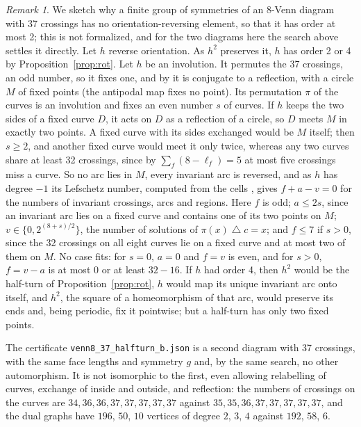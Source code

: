 \documentclass[11pt]{article}
\theoremstyle{remark}
\newtheorem{remark}[theorem]{Remark}
\begin{document}
\begin{remark}
We sketch why a finite group of symmetries of an $8$-Venn diagram with 37 crossings has no orientation-reversing
element, so that it has order at most 2; this is not formalized, and for the two diagrams here the search above
settles it directly. Let $h$ reverse orientation. As $h^2$ preserves it, $h$ has order 2 or 4 by
Proposition~\ref{prop:rot}. Let $h$ be an involution. It permutes the 37 crossings, an odd number, so it fixes one,
and by \cite{CK} it is conjugate to a reflection, with a circle $M$ of fixed points (the antipodal map fixes no
point). Its permutation $\pi$ of the curves is an involution and fixes an even number $s$ of curves. If $h$ keeps
the two sides of a fixed curve $D$, it acts on $D$ as a reflection of a circle, so $D$ meets $M$ in exactly two
points. A fixed curve with its sides exchanged would be $M$ itself; then $s\ge2$, and another fixed curve would meet
it only twice, whereas any two curves share at least 32 crossings, since by $\sum_f(8-\ell_f)=5$ at most five
crossings miss a curve. So no arc lies in $M$, every invariant arc is reversed, and as $h$ has degree $-1$ its
Lefschetz number, computed from the cells \cite[Section~22]{Mu}, gives $f+a-v=0$ for the numbers of invariant
crossings, arcs and regions. Here $f$ is odd; $a\le2s$, since an invariant arc lies on a fixed curve and contains one of its two points
on $M$; $v\in\{0,2^{(8+s)/2}\}$, the number of solutions of $\pi(x)\mathbin{\triangle}c=x$; and $f\le7$ if $s>0$,
since the 32 crossings on all eight curves lie on a fixed curve and at most two of them on $M$. No case fits: for
$s=0$, $a=0$ and $f=v$ is even, and for $s>0$, $f=v-a$ is at most 0 or at least $32-16$. If $h$ had order 4, then
$h^2$ would be the half-turn of Proposition~\ref{prop:rot}, $h$ would map its unique invariant arc onto itself, and
$h^2$, the square of a homeomorphism of that arc, would preserve its ends and, being periodic, fix it pointwise;
but a half-turn has only two fixed points.
\end{remark}

The certificate \texttt{venn8\_37\_halfturn\_b.json} is a second diagram with 37 crossings, with the same face
lengths and symmetry $g$ and, by the same search, no other automorphism. It is not isomorphic to the first, even allowing relabelling of curves, exchange of inside
and outside, and reflection: the numbers of crossings on the curves are $34,36,36,37,37,37,37,37$ against
$35,35,36,37,37,37,37,37$, and the dual graphs have $196$, $50$, $10$ vertices of degree $2$, $3$, $4$ against
$192$, $58$, $6$.
\end{document}
